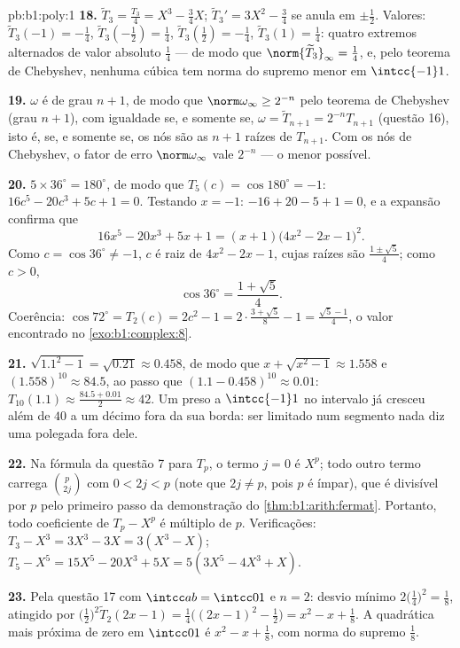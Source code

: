 \begin{solution}{pb:b1:poly:1}
\textbf{18.} $\widetilde T_3 = \frac{T_3}4 = X^3 - \frac34X$;
$\widetilde T_3{}' = 3X^2 - \frac34$ se anula em $\pm\frac12$.
Valores: $\widetilde T_3(-1) = -\frac14$, $\widetilde
T_3(-\tfrac12) = \frac14$, $\widetilde T_3(\tfrac12) = -\frac14$,
$\widetilde T_3(1) = \frac14$: quatro extremos alternados de
valor absoluto $\frac14$ --- de modo que $\norm{\widetilde T_3}_\infty =
\frac14$, e, pelo teorema de Chebyshev, nenhuma cúbica  tem norma
do supremo menor em $\intcc{-1}1$.

\textbf{19.} $\omega$ é  de grau $n + 1$, de modo que
$\norm\omega_\infty \geq 2^{-n}$ pelo teorema de Chebyshev (grau
$n+1$), com igualdade se, e somente se, $\omega = \widetilde T_{n+1}
= 2^{-n}T_{n+1}$ (questão 16), isto é, se, e somente se, os nós
são as $n + 1$ raízes de $T_{n+1}$. Com os nós de Chebyshev, o fator
de erro $\norm\omega_\infty$ vale $2^{-n}$ --- o menor possível.

\textbf{20.} $5 \times 36^\circ = 180^\circ$, de modo que $T_5(c) =
\cos180^\circ = -1$: $16c^5 - 20c^3 + 5c + 1 = 0$. Testando $x =
-1$: $-16 + 20 - 5 + 1 = 0$, e a expansão confirma que
\[
16x^5 - 20x^3 + 5x + 1 = (x + 1)\bigl(4x^2 - 2x - 1\bigr)^2 .
\]
Como $c = \cos36^\circ \neq -1$, $c$ é raiz de $4x^2 - 2x -
1$,
cujas raízes são $\frac{1 \pm \sqrt5}4$; como $c > 0$,
\[
\cos36^\circ = \frac{1 + \sqrt5}4 .
\]
Coerência: $\cos72^\circ = T_2(c) = 2c^2 - 1 = 2\cdot\frac{3 +
\sqrt5}8 - 1 = \frac{\sqrt5 - 1}4$, o valor encontrado no
\cref{exo:b1:complex:8}.

\textbf{21.} $\sqrt{1.1^2 - 1} = \sqrt{0.21} \approx 0.458$, de modo que
$x + \sqrt{x^2-1} \approx 1.558$ e $(1.558)^{10} \approx 84.5$,
ao passo que $(1.1 - 0.458)^{10} \approx 0.01$: $T_{10}(1.1) \approx
\frac{84.5 + 0.01}2 \approx 42$. Um  preso a
$\intcc{-1}1$ no intervalo já cresceu além de $40$ a um
décimo fora da sua borda: ser limitado num segmento nada diz uma
polegada fora dele.

\textbf{22.} Na fórmula da questão 7 para $T_p$, o termo $j = 0$
é $X^p$; todo outro termo carrega $\binom p{2j}$ com $0 < 2j <
p$
(note que $2j \neq p$, pois $p$ é ímpar), que é divisível por $p$
pelo primeiro passo da demonstração do \cref{thm:b1:arith:fermat}.
Portanto, todo coeficiente de $T_p - X^p$ é múltiplo de $p$.
Verificações: $T_3 - X^3 = 3X^3 - 3X = 3(X^3 - X)$; $T_5 - X^5 = 15X^5
- 20X^3 + 5X = 5(3X^5 - 4X^3 + X)$.

\textbf{23.} Pela questão 17 com $\intcc ab = \intcc01$ e $n =
2$: desvio mínimo $2\bigl(\frac14\bigr)^2 = \frac18$,
atingido por $\bigl(\frac12\bigr)^2\widetilde T_2(2x - 1) =
\frac14\bigl((2x-1)^2 - \frac12\bigr) = x^2 - x + \frac18$. A
quadrática  mais próxima de zero em $\intcc01$ é $x^2 - x +
\frac18$, com norma do supremo $\frac18$.


\end{solution}
